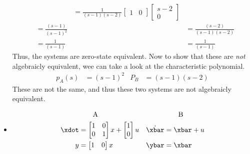 \documentclass[10pt]{article}
\begin{document}
\begin{itemize}
\begin{align*}
  &&=\frac{1}{(s-1)(s-2)}
  \begin{bmatrix}
    1 &0 
  \end{bmatrix}
  \begin{bmatrix}
    s-2 \\ 0
  \end{bmatrix}\\
  &=\frac{(s-1)}{(s-1)^2} 
  &&=\frac{(s-2)}{(s-1)(s-2)}\\
  &=\frac{1}{(s-1)}
  &&=\frac{1}{(s-1)}
\end{align*}
Thus, the systems are zero-state equivalent.  Now to show that these
are \emph{not} algebraicly equivalent, wee can take a look at the
characteristic polynomial.
\begin{align*}
  p_A(s) &= (s-1)^2 & P_B&=(s-1)(s-2)
\end{align*}
These are not the same, and thus these two systems are not algebraicly
equivalent. 

\item 
  \begin{align*}
    &\qquad \text{A} && \qquad\text{B}\\
    \xdot &=
    \begin{bmatrix}
      1 & 0 \\ 0 & 1
    \end{bmatrix}x + 
    \begin{bmatrix}
      1 \\ 0
    \end{bmatrix}u
    & \dot{\xbar} &=
      \xbar + u \\
    y &=
    \begin{bmatrix}
      1 & 0
    \end{bmatrix}x
    & \ybar &= \xbar
  \end{align*}


\end{itemize}
\end{document}
